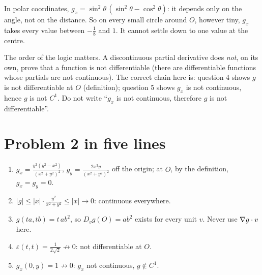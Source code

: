 \begin{intuition}
In polar coordinates, $g_x=\sin^2\theta\,(\sin^2\theta-\cos^2\theta)$: it depends only on the angle, not
on the distance. So on every small circle around $O$, however tiny, $g_x$ takes every value between
$-\frac18$ and $1$. It cannot settle down to one value at the centre.
\end{intuition}

\begin{trap}
The order of the logic matters. A discontinuous partial derivative does \emph{not}, on its own,
prove that a function is not differentiable (there are differentiable functions whose partials are
not continuous). The correct chain here is: question 4 shows $g$ is not differentiable at $O$
(definition); question 5 shows $g_x$ is not continuous, hence $g$ is not $C^1$. Do not write
``$g_x$ is not continuous, therefore $g$ is not differentiable''.
\end{trap}

\section{Problem 2 in five lines}

\begin{remember}[unbreakable]
\begin{enumerate}
  \item $g_x=\frac{y^2(y^2-x^2)}{(x^2+y^2)^2}$, $g_y=\frac{2x^3y}{(x^2+y^2)^2}$ off the origin; at $O$, by the definition, $g_x=g_y=0$.
  \item $|g|\le|x|\cdot\frac{y^2}{x^2+y^2}\le|x|\to0$: continuous everywhere.
  \item $g(ta,tb)=t\,ab^2$, so $D_vg(O)=ab^2$ exists for every unit $v$. Never use $\nabla g\cdot v$ here.
  \item $\varepsilon(t,t)=\frac1{2\sqrt2}\not\to0$: not differentiable at $O$.
  \item $g_x(0,y)=1\not\to0$: $g_x$ not continuous, $g\notin C^1$.
\end{enumerate}
\end{remember}
